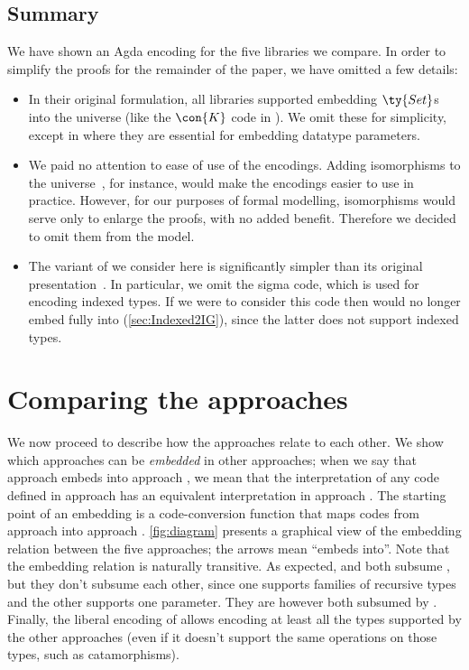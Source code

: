 \documentclass[submission,copyright,creativecommons,sharealike,noncommercial]{eptcs}
\newcommand{\Pedro}[1]{}
\begin{document}
\subsection{Summary}
We have shown an Agda encoding for the five libraries we compare. In order to
simplify the proofs for the remainder of the paper, we have omitted a few 
details:
\begin{itemize}
\item In their original formulation, all libraries supported embedding \ensuremath{\ty{Set}}s
into the universe (like the \ensuremath{\con{K}} code in \ig). We omit these for simplicity,
except in \ig where they are essential for embedding datatype parameters.

\item We paid no attention to ease of use of the encodings. Adding
isomorphisms to the universe~\cite{jpm:gpif:11}, for instance, would make the
encodings easier to use in practice. However, for our purposes of formal
modelling, isomorphisms would serve only to enlarge the proofs, with no added
benefit. Therefore we decided to omit them from the model.

\item The variant of \indexed we consider here is significantly simpler than
its original presentation~\cite{jpm:gpif:11}. In particular, we omit the sigma
code, which is used for encoding indexed types. If we were to consider this
code then \indexed would no longer embed fully into \ig
(\autoref{sec:Indexed2IG}), since the latter does not support indexed types.
\end{itemize}

\Pedro{Say something about inductive vs. coinductive fixed points?}
\section{Comparing the approaches}
\label{sec:comparison}We now proceed to describe how the approaches relate to each other. We show
which approaches can be \emph{embedded} in other approaches; when we say that
approach  embeds into approach , we mean that the interpretation of any
code defined in approach  has an equivalent interpretation in approach .
The starting point of an embedding is a code-conversion function that maps codes
from approach  into approach . \autoref{fig:diagram} presents a graphical
view of the embedding relation between the five approaches; the arrows mean
``embeds into''. Note that the embedding relation is naturally transitive.
\Pedro{But we haven't shown this.}As expected, \multirec and \polyp both subsume \regular, but they don't
subsume each other, since one supports families of recursive types and the
other supports one parameter. They are however both subsumed by \indexed.
Finally, the liberal encoding of \ig allows encoding at least all the types
supported by the other approaches (even if it doesn't support the same
operations on those types, such as catamorphisms).
\end{document}
